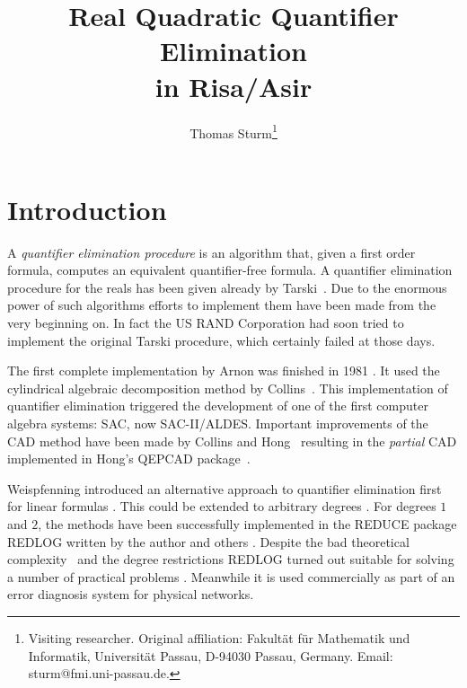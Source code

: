 \newcommand{\msub}{/\kern-3pt/}
\isismemo
{}

\title{Real Quadratic Quantifier Elimination\\ in Risa/Asir}
\author{Thomas Sturm\thanks{Visiting researcher. Original affiliation: 
Fakult\"at f\"ur Mathematik und Informatik, Universit\"at Passau,
D-94030 Passau, Germany. Email: sturm@fmi.uni-passau.de.}}
\maketitle
%
\section{Introduction}
A {\em quantifier elimination procedure} is an algorithm that, given a
first order formula, computes an equivalent quantifier-free formula. A
quantifier elimination procedure for the reals has been given already
by Tarski~\cite{Tarski:48}. Due to the enormous power of such
algorithms efforts to implement them have been made from the very
beginning on. In fact the US RAND Corporation had soon tried to
implement the original Tarski procedure, which certainly failed at
those days.

The first complete implementation by Arnon was finished in 1981
\cite{Arnon:81}. It used the cylindrical algebraic decomposition
method by Collins~\cite{Collins:75}. This implementation of quantifier
elimination triggered the development of one of the first computer
algebra systems: SAC, now SAC-II/ALDES. Important improvements of the
CAD method have been made by Collins and Hong~\cite{CollinsHong:91}
resulting in the {\em partial} CAD implemented in Hong's QEPCAD
package~\cite{Hong:93}.

Weispfenning introduced an alternative approach to quantifier
elimination first for linear formulas \cite{Weispfenning:88}. This
could be extended to arbitrary degrees
\cite{LoosWeispfenning:93,Weispfenning:96,Weispfenning:94}. For
degrees $1$ and $2$, the methods have been successfully implemented in
the REDUCE package REDLOG written by the author and others
\cite{DolzmannSturm:95a,DolzmannSturm:96}. Despite the bad theoretical
complexity~\cite{Weispfenning:88,Davenport:88} and the degree
restrictions REDLOG turned out suitable for solving a number of
practical problems \cite{Weispfenning:95b,Weispfenning:96b}. Meanwhile
it is used commercially as part of an error diagnosis system for
physical networks.

